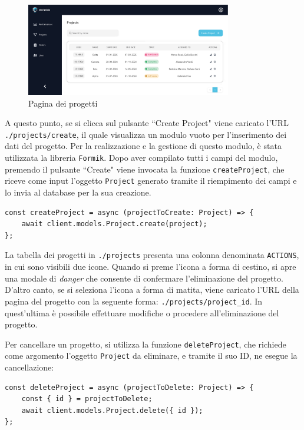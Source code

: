 \documentclass[target=bach,aauheader=,style=]{thud}
\begin{document}
\begin{figure}[H]
    \centering
    \includegraphics[width=0.8\textwidth]{img/interfacce/table_project.pdf} 
    \caption{Pagina dei progetti}
\end{figure}

\noindent A questo punto, se si clicca sul pulsante ``Create Project" viene caricato l'URL \texttt{./projects/create}, il quale visualizza un modulo vuoto per l'inserimento dei dati del progetto. Per la realizzazione e la gestione di questo modulo, è stata utilizzata la libreria \texttt{Formik}. Dopo aver compilato tutti i campi del modulo, premendo il pulsante ``Create" viene invocata la funzione \texttt{createProject}, che riceve come input l'oggetto \texttt{Project} generato tramite il riempimento dei campi e lo invia al database per la sua creazione.

\begin{lstlisting}[caption=funzione \texttt{createProject}]
const createProject = async (projectToCreate: Project) => {
    await client.models.Project.create(project);
};
\end{lstlisting}

\noindent La tabella dei progetti in \texttt{./projects} presenta una colonna denominata \texttt{ACTIONS}, in cui sono visibili due icone. Quando si preme l'icona a forma di cestino, si apre una modale di \textit{danger} che consente di confermare l'eliminazione del progetto. D'altro canto, se si seleziona l'icona a forma di matita, viene caricato l'URL della pagina del progetto con la seguente forma: \texttt{./projects/project\_id}. In quest'ultima è possibile effettuare modifiche o procedere all'eliminazione del progetto.

\noindent Per cancellare un progetto, si utilizza la funzione \texttt{deleteProject}, che richiede come argomento l'oggetto \texttt{Project} da eliminare, e tramite il suo ID, ne esegue la cancellazione:

\begin{lstlisting}[caption=funzione \texttt{deleteProject}]
const deleteProject = async (projectToDelete: Project) => {
    const { id } = projectToDelete;
    await client.models.Project.delete({ id });
};
\end{lstlisting}
\end{document}

